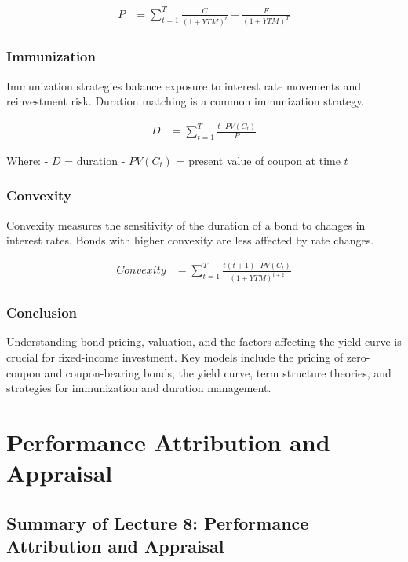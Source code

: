 \documentclass[
]{book}
\begin{document}
\[
\begin{align}
P &= \sum_{t=1}^{T} \frac{C}{(1 + YTM)^t} + \frac{F}{(1 + YTM)^T}
\end{align}
\]

\hypertarget{immunization}{%
\subsection{Immunization}\label{immunization}}

Immunization strategies balance exposure to interest rate movements and reinvestment risk. Duration matching is a common immunization strategy.

\[
\begin{align}
D &= \sum_{t=1}^{T} \frac{t \cdot PV(C_t)}{P}
\end{align}
\]

Where:
- \(D\) = duration
- \(PV(C_t)\) = present value of coupon at time \(t\)

\hypertarget{convexity}{%
\subsection{Convexity}\label{convexity}}

Convexity measures the sensitivity of the duration of a bond to changes in interest rates. Bonds with higher convexity are less affected by rate changes.

\[
\begin{align}
Convexity &= \sum_{t=1}^{T} \frac{t (t + 1) \cdot PV(C_t)}{(1 + YTM)^{t+2}}
\end{align}
\]

\hypertarget{conclusion}{%
\subsection{Conclusion}\label{conclusion}}

Understanding bond pricing, valuation, and the factors affecting the yield curve is crucial for fixed-income investment. Key models include the pricing of zero-coupon and coupon-bearing bonds, the yield curve, term structure theories, and strategies for immunization and duration management.

\hypertarget{ch8}{%
\chapter{Performance Attribution and Appraisal}\label{ch8}}

\hypertarget{summary-of-lecture-8-performance-attribution-and-appraisal}{%
\section{Summary of Lecture 8: Performance Attribution and Appraisal}\label{summary-of-lecture-8-performance-attribution-and-appraisal}}
\end{document}
